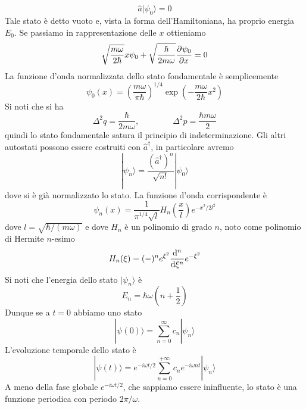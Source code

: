 \documentclass[a4paper, 11pt]{article}
\renewcommand{\ket}[1]{| #1\rangle}
\begin{document}
\[\hat a\ket{\psi_0}=0\]
Tale stato è detto vuoto e, vista la forma dell'Hamiltoniana, ha proprio energia $E_0$. Se passiamo in rappresentazione delle $x$ ottieniamo 
\[\sqrt{\frac{m\omega}{2\hbar}}x\psi_0+\sqrt{\frac{\hbar}{2m\omega}}\pder{\psi_0}{x}=0\]
La funzione d'onda normalizzata dello stato fondamentale è semplicemente
\[\psi_0(x)=\left(\frac{m\omega}{\pi\hbar}\right)^{1/4}\exp\left(-\frac{m\omega}{2\hbar}x^2\right)\]
Si noti che si ha
\[\Delta^2q=\frac{\hbar}{2m\omega},\quad\quad\quad\quad\Delta^2p=\frac{\hbar m\omega}{2}\]
quindi lo stato fondamentale satura il principio di indeterminazione.
Gli altri autostati possono essere costruiti con $\hat a^\dagger$, in particolare avremo
\[\ket {\psi_n}=\frac{(\hat a^\dagger)^n}{\sqrt{n!}}\ket {\psi_0}\]
dove si è già normalizzato lo stato. La funzione d'onda corrispondente è
\[\psi_n(x)=\frac{1}{\pi^{1/4}\sqrt{l}}H_n\left(\frac{x}{l}\right)e^{-x^2/2l^2}\]
dove $l=\sqrt{\hbar/(m\omega)}$ e dove $H_n$ è un polinomio di grado $n$, noto come polinomio di Hermite $n$-esimo
\[H_n(\xi)=(-)^ne^{\xi^2}\der[n]{}{\xi}e^{-\xi^2}\]
Si noti che l'energia dello stato $\ket{\psi_n}$ è
\[E_n=\hbar\omega\left(n+\frac{1}{2}\right)\]
Dunque se a $t=0$ abbiamo uno stato
\[\ket{\psi(0)}=\sum_{n=0}^{\infty}c_n\ket {\psi_n}\]
L'evoluzione temporale dello stato è
\[\ket{\psi(t)}=e^{-i\omega t/2}\sum_{n=0}^{+\infty}c_ne^{-i\omega nt}\ket {\psi_n}\]
A meno della fase globale $e^{-i\omega t/2}$, che sappiamo essere ininfluente, lo stato è una funzione periodica con periodo $2\pi/\omega$.
\end{document}
